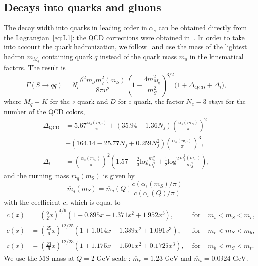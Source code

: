 \documentclass[a4paper,12pt,dvipsnames,usernames]{article}
\begin{document}
\subsection{Decays into quarks and gluons}
\label{sec:decay-perturbative}
The decay width into quarks in leading order in $\alpha_{s}$ can be obtained directly from the Lagrangian~\eqref{eq:L1}; the QCD corrections were obtained in~\cite{Spira:1997dg}. In order to take into account the quark hadronization, we follow~\cite{Winkler:2018qyg,Alekhin:2015byh,Gunion:1989we} and use the mass of the lightest hadron $m_{M_{q}}$ containing quark $q$ instead of the quark mass $m_{q}$ in the kinematical factors. The result is
\begin{equation}
    \Gamma (S \rightarrow \bar{q} q) 
    = N_c \frac{  \theta^2 m_S \overline{m}_q^2(m_S)}{8 \pi v^2} \left( 1 - \dfrac{4 \overline{m}_{M_{q}}^2}{m_S^2} \right)^{3/2} 
    \big(1 + \Delta_{\text{QCD}} + \Delta_t\big),
    \label{eq:decay-quarks}
\end{equation}
where $M_{q} = K$ for the $s$ quark and $D$ for $c$ quark, the factor $N_c = 3$ stays for the number of the QCD colors,\vspace{-1em}
\begin{align}
    \Delta_{\text{QCD}} &= 
    5.67 \frac{\alpha_s(m_S)}{\pi} + (35.94 - 1.36 N_f) \left(\frac{\alpha_s(m_S)}{\pi}\right)^2 
    \nonumber\\
    &+ (164.14 - 25.77 N_f + 0.259 N_f^2) \left(\frac{\alpha_s(m_S)}{\pi}\right)^3, \\
    \Delta_t &= \left(\frac{\alpha_s(m_S)}{\pi}\right)^2 
    \left( 1.57 - \frac{2}{3}
    \text{log}\frac{m_S^2}{m_t^2} + \frac{1}{9} \text{log}^2 \frac{\overline{m}_q^2(m_S)}{m_S^2}\right),
\end{align}
and the running mass \cite{Spira:1997dg} $\overline{m}_q(m_S)$ is given by\vspace{-0.5em}
\begin{equation}
    \overline{m}_q(m_S) = 
    \overline{m}_q(Q) 
    \frac{c(\alpha_s(m_S)/\pi)}{c(\alpha_s(Q)/\pi)},
\end{equation}
with the coefficient $c$, which is equal to\vspace{-0.5em}
\begin{align}
    c(x) &= \left(\frac{9}{2} x\right)^{4/9} 
    (1 + 0.895 x + 1.371 x^2 + 1.952 x^3), 
    &\text{ for }
    &m_s < m_S < m_{c}, \\
    c(x) &= \left(\frac{25}{6} x\right)^{12/25} (1 + 1.014 x + 1.389 x^2+ 1.091 x^3), 
    &\text{ for }
    &m_{c} < m_S < m_{b},\\
    c(x) &= \left(\frac{23}{6} x\right)^{12/23} (1 + 1.175 x + 1.501 x^2 + 0.1725 x^3), &\text{ for }
    &m_{b} < m_S < m_t.
\end{align}
We use the MS-mass at $Q = 2 \text{ GeV}$ scale \cite{Sanfilippo:2015era}: $\overline{m}_c = 1.23 \text{ GeV}$ and $\overline{m}_s = 0.0924 \text{ GeV}$.
\end{document}
